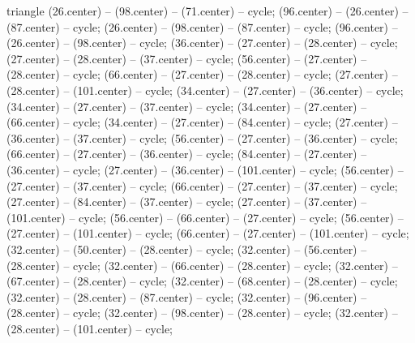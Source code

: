 \begin{pgfonlayer}{triangle}
 (26.center) -- (98.center) -- (71.center) -- cycle; 
 (96.center) -- (26.center) -- (87.center) -- cycle; 
 (26.center) -- (98.center) -- (87.center) -- cycle; 
 (96.center) -- (26.center) -- (98.center) -- cycle; 
 (36.center) -- (27.center) -- (28.center) -- cycle; 
 (27.center) -- (28.center) -- (37.center) -- cycle; 
 (56.center) -- (27.center) -- (28.center) -- cycle; 
 (66.center) -- (27.center) -- (28.center) -- cycle; 
 (27.center) -- (28.center) -- (101.center) -- cycle; 
 (34.center) -- (27.center) -- (36.center) -- cycle; 
 (34.center) -- (27.center) -- (37.center) -- cycle; 
 (34.center) -- (27.center) -- (66.center) -- cycle; 
 (34.center) -- (27.center) -- (84.center) -- cycle; 
 (27.center) -- (36.center) -- (37.center) -- cycle; 
 (56.center) -- (27.center) -- (36.center) -- cycle; 
 (66.center) -- (27.center) -- (36.center) -- cycle; 
 (84.center) -- (27.center) -- (36.center) -- cycle; 
 (27.center) -- (36.center) -- (101.center) -- cycle; 
 (56.center) -- (27.center) -- (37.center) -- cycle; 
 (66.center) -- (27.center) -- (37.center) -- cycle; 
 (27.center) -- (84.center) -- (37.center) -- cycle; 
 (27.center) -- (37.center) -- (101.center) -- cycle; 
 (56.center) -- (66.center) -- (27.center) -- cycle; 
 (56.center) -- (27.center) -- (101.center) -- cycle; 
 (66.center) -- (27.center) -- (101.center) -- cycle; 
 (32.center) -- (50.center) -- (28.center) -- cycle; 
 (32.center) -- (56.center) -- (28.center) -- cycle; 
 (32.center) -- (66.center) -- (28.center) -- cycle; 
 (32.center) -- (67.center) -- (28.center) -- cycle; 
 (32.center) -- (68.center) -- (28.center) -- cycle; 
 (32.center) -- (28.center) -- (87.center) -- cycle; 
 (32.center) -- (96.center) -- (28.center) -- cycle; 
 (32.center) -- (98.center) -- (28.center) -- cycle; 
 (32.center) -- (28.center) -- (101.center) -- cycle; 

\end{pgfonlayer}
